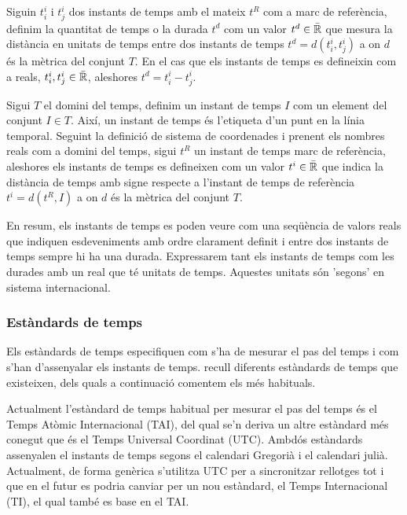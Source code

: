 \begin{definition}[Temps]
  \label{def:model:temps}
  Siguin $t^i_i$ i $t^i_j$ dos instants de temps amb el mateix $t^R$
  com a marc de referència, definim la quantitat de temps o la durada
  $t^d$ com un valor $t^d \in\bar{\mathbb{R}{}}$ que mesura la distància en
  unitats de temps entre dos instants de temps $t^d = d(t^i_i,t^i_j)$
  a on $d$ és la mètrica del conjunt $T$. En el cas que els instants
  de temps es defineixin com a reals, $t^i_i , t^i_j \in \bar{\mathbb{R}{}}$,
  aleshores $t^d = t^i_i - t^i_j$.

  Sigui $T$ el domini del temps, definim un instant de temps $I$ com
  un element del conjunt $I \in T$. Així, un instant de temps és
  l'etiqueta d'un punt en la línia temporal. Seguint la definició de
  sistema de coordenades i prenent els nombres reals com a domini del
  temps, sigui $t^{R}$ un instant de temps marc de referència,
  aleshores els instants de temps es defineixen com un valor $t^i
  \in\bar{\mathbb{R}{}}$ que indica la distància de temps amb signe respecte a
  l'instant de temps de referència $t^i= d(t^{R},I)$ a on $d$ és la
  mètrica del conjunt $T$.
\end{definition}

En resum, els instants de temps es poden veure com una seqüència de
valors reals que indiquen esdeveniments amb ordre clarament definit i
entre dos instants de temps sempre hi ha una durada. Expressarem tant
els instants de temps com les durades amb un real que té unitats de
temps. Aquestes unitats són 'segons' en sistema internacional.




\subsubsection{Estàndards de temps}

Els estàndards de temps especifiquen com s'ha de mesurar el pas del
temps i com s'han d'assenyalar els instants de temps.
\textcite{allen:timescales} recull diferents estàndards de temps
que existeixen, dels quals a continuació comentem els més habituals.

Actualment l'estàndard de temps habitual per mesurar el pas del temps
és el Temps Atòmic Internacional (TAI), del qual se'n deriva un altre
estàndard més conegut que és el Temps Universal Coordinat (UTC).
Ambdós estàndards assenyalen el instants de temps segons el calendari
Gregorià i el calendari julià. Actualment, de forma genèrica s'utilitza
UTC per a sincronitzar rellotges tot i que en el futur es podria
canviar per un nou estàndard, el Temps Internacional (TI), el qual
també es base en el TAI.

